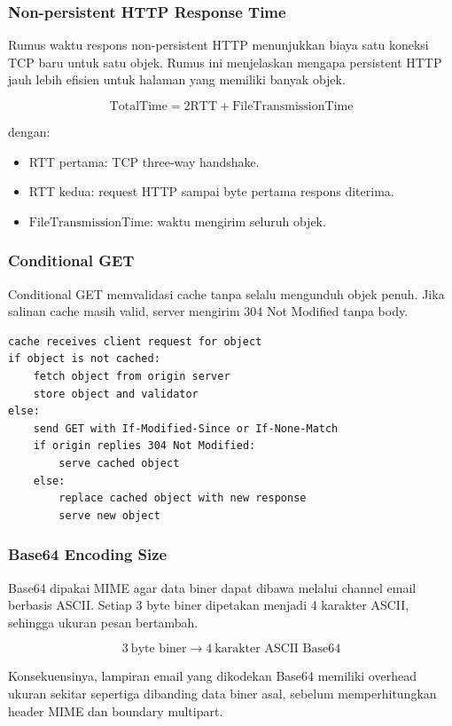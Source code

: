 \subsubsection{Non-persistent HTTP Response Time}
\begin{jawab}
Rumus waktu respons non-persistent HTTP menunjukkan biaya satu koneksi TCP baru untuk satu objek. Rumus ini menjelaskan mengapa persistent HTTP jauh lebih efisien untuk halaman yang memiliki banyak objek.
\end{jawab}

\begin{equation}
    \text{TotalTime}
    =
    2\text{RTT}
    +
    \text{FileTransmissionTime}
    \label{eq:http-nonpersistent}
\end{equation}

dengan:
\begin{itemize}
    \item RTT pertama: TCP three-way handshake.
    \item RTT kedua: request HTTP sampai byte pertama respons diterima.
    \item $\text{FileTransmissionTime}$: waktu mengirim seluruh objek.
\end{itemize}

\subsubsection{Conditional GET}
\begin{jawab}
Conditional GET memvalidasi cache tanpa selalu mengunduh objek penuh. Jika salinan cache masih valid, server mengirim 304 Not Modified tanpa body.
\end{jawab}

\begin{lstlisting}[caption={Pseudocode Conditional GET}, label={lst:conditional-get}]
cache receives client request for object
if object is not cached:
    fetch object from origin server
    store object and validator
else:
    send GET with If-Modified-Since or If-None-Match
    if origin replies 304 Not Modified:
        serve cached object
    else:
        replace cached object with new response
        serve new object
\end{lstlisting}

\subsubsection{Base64 Encoding Size}
\begin{jawab}
Base64 dipakai MIME agar data biner dapat dibawa melalui channel email berbasis ASCII. Setiap 3 byte biner dipetakan menjadi 4 karakter ASCII, sehingga ukuran pesan bertambah.
\end{jawab}

\begin{equation}
    3\ \text{byte biner} \rightarrow 4\ \text{karakter ASCII Base64}
    \label{eq:base64}
\end{equation}

Konsekuensinya, lampiran email yang dikodekan Base64 memiliki overhead ukuran sekitar sepertiga dibanding data biner asal, sebelum memperhitungkan header MIME dan boundary multipart.
